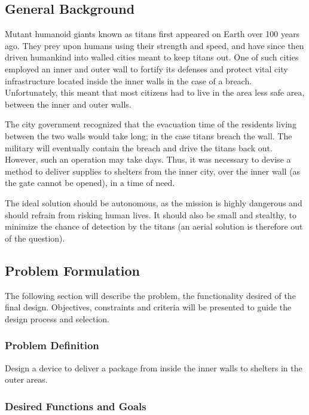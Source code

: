 \documentclass[ece]{uw-wkrpt}
\begin{document}
\subsection{General Background}

Mutant humanoid giants known as titans first appeared on Earth over 100 years ago. They prey upon humans using their strength and speed, and have since then driven humankind into walled cities meant to keep titans out. One of such cities employed an inner and outer wall to fortify its defenses and protect vital city infrastructure located inside the inner walls in the case of a breach. Unfortunately, this meant that most citizens had to live in the area less safe area, between the inner and outer walls.

The city government recognized that the evacuation time of the residents living between the two walls would take long; in the case titans breach the wall. The military will eventually contain the breach and drive the titans back out. However, such an operation may take days. Thus, it was necessary to devise a method to deliver supplies to shelters from the inner city, over the inner wall (as the gate cannot be opened), in a time of need.

The ideal solution should be autonomous, as the mission is highly dangerous and should refrain from risking human lives. It should also be small and stealthy, to minimize the chance of detection by the titans (an aerial solution is therefore out of the question).


\subsection{Problem Formulation}

The following section will describe the problem, the functionality desired of the final design. Objectives, constraints and criteria will be presented to guide the design process and selection.

\subsubsection{Problem Definition}

Design a device to deliver a package from inside the inner walls to shelters in the outer areas.

\subsubsection{Desired Functions and Goals}
\end{document}
